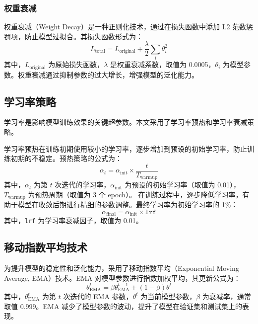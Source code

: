 \subsubsection{权重衰减}
权重衰减（Weight Decay）是一种正则化技术，通过在损失函数中添加 L2 范数惩罚项，防止模型过拟合。其损失函数形式为：
\begin{equation}
	L_{\text{total}} = L_{\text{original}} + \frac{\lambda}{2} \sum_{i} \theta_i^2
\end{equation}
其中，$L_{\text{original}}$ 为原始损失函数，$\lambda$ 是权重衰减系数，取值为 0.0005，$\theta_i$ 为模型参数。权重衰减通过抑制参数的过大增长，增强模型的泛化能力。

\subsection{学习率策略}
学习率是影响模型训练效果的关键超参数。本文采用了学习率预热和学习率衰减策略。

学习率预热在训练初期使用较小的学习率，逐步增加到预设的初始学习率，防止训练初期的不稳定。预热策略的公式为：
\begin{equation}
	\alpha_t = \alpha_{\text{init}} \times \frac{t}{T_{\text{warmup}}}
\end{equation}
其中，$\alpha_t$ 为第 $t$ 次迭代的学习率，$\alpha_{\text{init}}$ 为预设的初始学习率（取值为 0.01），$T_{\text{warmup}}$ 为预热周期（取值为 3 个 epoch）。
在训练过程中，逐步降低学习率，有助于模型在收敛后期进行精细的参数调整。最终学习率为初始学习率的 1\%：
\begin{equation}
	\alpha_{\text{final}} = \alpha_{\text{init}} \times \texttt{lrf}
\end{equation}
其中，\texttt{lrf} 为学习率衰减因子，取值为 0.01。

\subsection{移动指数平均技术}
为提升模型的稳定性和泛化能力，采用了移动指数平均（Exponential Moving Average, EMA）技术。EMA 对模型参数进行指数加权平均，其更新公式为：
\begin{equation}
	\theta_{\text{EMA}}^t = \beta \theta_{\text{EMA}}^{t-1} + (1 - \beta) \theta^t
\end{equation}
其中，$\theta_{\text{EMA}}^t$ 为第 $t$ 次迭代的 EMA 参数，$\theta^t$ 为当前模型参数，$\beta$ 为衰减率，通常取值 0.999。EMA 减少了模型参数的波动，提升了模型在验证集和测试集上的表现。

